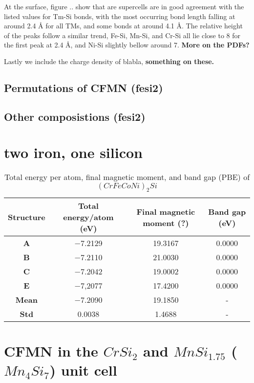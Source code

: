 At the surface, figure .. show that are supercells are in good agreement with the listed values for Tm-Si bonds, with the most occurring bond length falling at around 2.4 Å for all TMs, and some bonds at around 4.1 Å. The relative height of the peaks follow a similar trend, Fe-Si, Mn-Si, and Cr-Si all lie close to 8 for the first peak at 2.4 Å, and Ni-Si slightly bellow around 7. \textbf{More on the PDFs?}


Lastly we include the charge density of blabla, \textbf{something on these.}

\subsection{Permutations of CFMN (fesi2)}


\subsection{Other composistions (fesi2)}

\section{two iron, one silicon}

\begin{table}[H]
\centering
\begin{tabular}{@{}cccc@{}}
\toprule
Structure  & Total energy/atom (eV) & Final magnetic moment (?) & Band gap (eV) \\ \midrule
\textbf{A} & −7.2129                & 19.3167                    & 0.0000        \\
\textbf{B} & −7.2110                & 21.0030                    & 0.0000        \\
\textbf{C} & −7.2042                & 19.0002                    & 0.0000        \\
\textbf{E} & −7,2077                & 17.4200                    & 0.0000             \\
\textbf{Mean} & −7.2090            & 19.1850                  	 & -        \\ 
\textbf{Std} & 0.0038				  & 	1.4688						& -				\\ \bottomrule
\end{tabular}
\caption{Total energy per atom, final magnetic moment, and band gap (PBE) of $(CrFeCoNi)_2Si$  }
\label{table:fesi2_summary}
\end{table}  

\section{CFMN in the $CrSi_2$ and $MnSi_{1.75}$ ($Mn_4Si_7$) unit cell}

